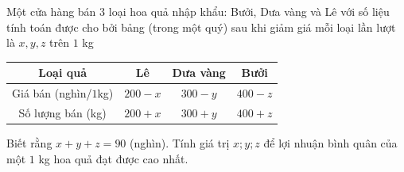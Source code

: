 \begin{bt}%
	Một cửa hàng bán $3$ loại hoa quả nhập khẩu: Bưởi, Dưa vàng và Lê với số liệu tính toán được cho bởi bảng  (trong một quý) sau khi giảm giá mỗi loại lần lượt là $x,y,z$ trên $1$ kg
\begin{center}
	\begin{tabular}{|c|c|c|c|}
		\hline
		Loại quả & Lê &Dưa vàng&Bưởi \\
		\hline
		Giá bán (nghìn/$1$kg) & $200-x$&$300-y$&$400-z$ \\
		\hline
		Số lượng bán (kg)& $200+x$&$300+y$&$400+z$\\
		\hline
	\end{tabular}
\end{center}
Biết rằng $x+y+z = 90$ (nghìn). Tính giá trị $ x;y;z$ để lợi nhuận bình quân của một $1$ kg hoa quả đạt được cao nhất.

\end{bt}

